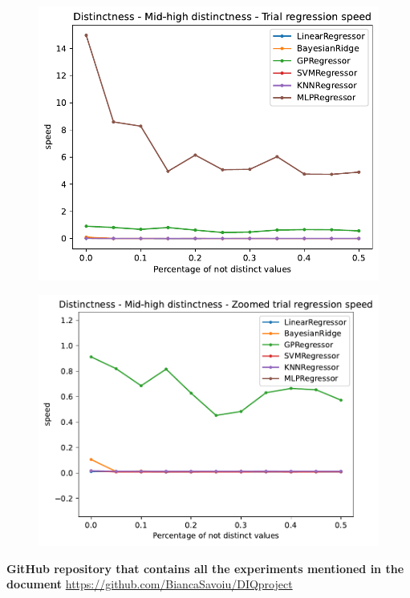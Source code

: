 \documentclass{Configuration_Files/PoliMi3i_thesis}
\begin{document}
\begin{figure}
    \centering
    \includegraphics[scale=0.6]{Images/distinctness/dex1/Distinctness - Mid-high distinctness - Trial regression speed.pdf}
\end{figure}
\begin{figure}
    \centering
    \includegraphics[scale=0.6]{Images/distinctness/dex1/Distinctness - Mid-high distinctness - Zoomed trial regression speed.pdf}
\end{figure}
    

    







\cleardoublepage
\begin{thebibliography}{100}
         \textbf{GitHub repository that contains all the experiments mentioned in the document} \href{https://github.com/BiancaSavoiu/DIQ_project}{https://github.com/BiancaSavoiu/DIQproject}
    \end{thebibliography}
\end{document}
